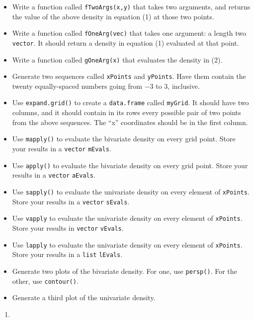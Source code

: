 \documentclass[12pt,krantz2]{krantz}
\providecommand{\tightlist}{%
  \setlength{\itemsep}{0pt}\setlength{\parskip}{0pt}}
\begin{document}
\begin{itemize}
\tightlist
\item
  Write a function called \texttt{fTwoArgs(x,y)} that takes two arguments, and returns the value of the above density in equation (1) at those two points.
\item
  Write a function called \texttt{fOneArg(vec)} that takes one argument: a length two \texttt{vector}. It should return a density in equation (1) evaluated at that point.
\item
  Write a function called \texttt{gOneArg(x)} that evaluates the density in (2).
\item
  Generate two sequences called \texttt{xPoints} and \texttt{yPoints}. Have them contain the twenty equally-spaced numbers going from \(-3\) to \(3\), inclusive.
\item
  Use \texttt{expand.grid()} to create a \texttt{data.frame} called \texttt{myGrid}. It should have two columns, and it should contain in its rows every possible pair of two points from the above sequences. The ``x'' coordinates should be in the first column.
\item
  Use \texttt{mapply()} to evaluate the bivariate density on every grid point. Store your results in a \texttt{vector} \texttt{mEvals}.
\item
  Use \texttt{apply()} to evaluate the bivariate density on every grid point. Store your results in a \texttt{vector} \texttt{aEvals}.
\item
  Use \texttt{sapply()} to evaluate the univariate density on every element of \texttt{xPoints}. Store your results in a \texttt{vector} \texttt{sEvals}.
\item
  Use \texttt{vapply} to evaluate the univariate density on every element of \texttt{xPoints}. Store your results in \texttt{vector} \texttt{vEvals}.
\item
  Use \texttt{lapply} to evaluate the univariate density on every element of \texttt{xPoints}. Store your results in a \texttt{list} \texttt{lEvals}.
\item
  Generate two plots of the bivariate density. For one, use \texttt{persp()}. For the other, use \texttt{contour()}.
\item
  Generate a third plot of the univariate density.
\end{itemize}

\begin{enumerate}
\def\labelenumi{\arabic{enumi}.}
\setcounter{enumi}{1}
\item
\end{enumerate}
\end{document}
